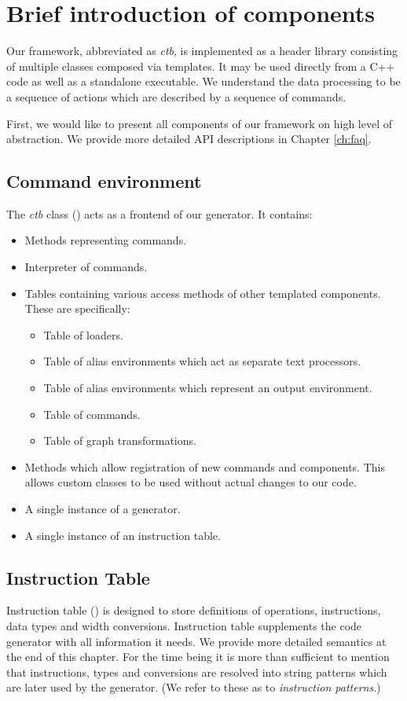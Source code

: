 \section{Brief introduction of components}

Our framework, abbreviated as \emph{ctb}, is implemented as a header library consisting of multiple classes composed via templates. It may be used directly from a C++ code as well as a standalone executable. We understand the data processing to be a sequence of actions which are described by a sequence of commands. 

First, we would like to present all components of our framework on high level of abstraction. We provide more detailed API descriptions in Chapter \ref{ch:faq}.

\subsection*{Command environment}
  The \emph{ctb} class () acts as a frontend of our generator. It contains:
  \begin{itemize}
    \item Methods representing commands.
    \item Interpreter of commands.
    \item Tables containing various access methods of other templated components. These are specifically:
    \begin{itemize}
      \item Table of loaders.
      \item Table of alias environments which act as separate text processors.
      \item Table of alias environments which represent an output environment.
      \item Table of commands.
      \item Table of graph transformations.
    \end{itemize}
    \item Methods which allow registration of new commands and components. This allows custom classes to be used without actual changes to our code.
    \item A single instance of a generator.
    \item A single instance of an instruction table.
  \end{itemize}

\subsection*{Instruction Table} 
  Instruction table () is designed to store definitions of operations, instructions, data types and width conversions. Instruction table supplements the code generator with all information it needs. We provide more detailed semantics at the end of this chapter. For the time being it is more than sufficient to mention that instructions, types and conversions are resolved into string patterns which are later used by the generator. (We refer to these as to \emph{instruction patterns}.)

